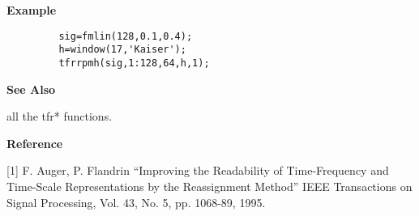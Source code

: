 
{\bf \large \sf Example}
\begin{verbatim}
         sig=fmlin(128,0.1,0.4); 
         h=window(17,'Kaiser'); 
         tfrrpmh(sig,1:128,64,h,1);
\end{verbatim}
\vspace*{.5cm}

{\bf \large \sf See Also}\\
\hspace*{1.5cm}
\begin{minipage}[t]{13.5cm}
all the {\ty tfr*} functions.
\end{minipage}
\vspace*{.5cm}


{\bf \large \sf Reference}\\
\hspace*{1.5cm}
\begin{minipage}[t]{13.5cm}
[1] F. Auger, P. Flandrin ``Improving the Readability of Time-Frequency and
Time-Scale Representations by the Reassignment Method'' IEEE Transactions
on Signal Processing, Vol. 43, No. 5, pp. 1068-89, 1995.
\end{minipage}

